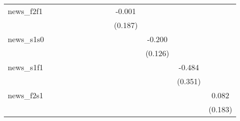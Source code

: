 {\begin{tabular}{l*{12}{c}}
\addlinespace
news\_f2f1   &                     &                     &                     &                     &                     &                     &                     &                     &      -0.001         &                     &                     &                     \\
            &                     &                     &                     &                     &                     &                     &                     &                     &     (0.187)         &                     &                     &                     \\
\addlinespace
news\_s1s0   &                     &                     &                     &                     &                     &                     &                     &                     &                     &      -0.200         &                     &                     \\
            &                     &                     &                     &                     &                     &                     &                     &                     &                     &     (0.126)         &                     &                     \\
\addlinespace
news\_s1f1   &                     &                     &                     &                     &                     &                     &                     &                     &                     &                     &      -0.484         &                     \\
            &                     &                     &                     &                     &                     &                     &                     &                     &                     &                     &     (0.351)         &                     \\
\addlinespace
news\_f2s1   &                     &                     &                     &                     &                     &                     &                     &                     &                     &                     &                     &       0.082         \\
            &                     &                     &                     &                     &                     &                     &                     &                     &                     &                     &                     &     (0.183)         \\

\end{tabular}}
